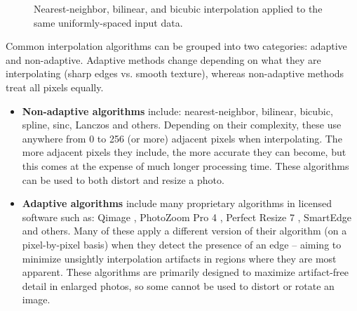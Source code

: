\documentclass[]{usiinfbachelorproject}
\begin{document}
\begin{figure}[ht]
	\centering
	\caption{ Nearest-neighbor,  bilinear, and  bicubic interpolation applied to the same uniformly-spaced input data.}
	\label{fig:nn-bl-bc3d}
\end{figure}

\noindent Common interpolation algorithms can be grouped into two categories: adaptive and non-adaptive. Adaptive methods change depending on what they are interpolating (sharp edges vs. smooth texture), whereas non-adaptive methods treat all pixels equally.
\begin{itemize}
	\item {\bf Non-adaptive algorithms} include: nearest-neighbor, bilinear, bicubic, spline, sinc, Lanczos \cite{Wolberg1990} and others. Depending on their complexity, these use anywhere from 0 to 256 (or more) adjacent pixels when interpolating. The more adjacent pixels they include, the more accurate they can become, but this comes at the expense of much longer processing time. These algorithms can be used to both distort and resize a photo.
	\item {\bf Adaptive algorithms} include many proprietary algorithms in licensed software such as: Qimage \cite{Qimage2012}, PhotoZoom Pro 4 \cite{Benvista2012}, Perfect Resize 7 \cite{Perfect2012}, SmartEdge \cite{Smartedge2007} and others. Many of these apply a different version of their algorithm (on a pixel-by-pixel basis) when they detect the presence of an edge -- aiming to minimize unsightly interpolation artifacts in regions where they are most apparent. These algorithms are primarily designed to maximize artifact-free detail in enlarged photos, so some cannot be used to distort or rotate an image.
\end{itemize}
\end{document}
